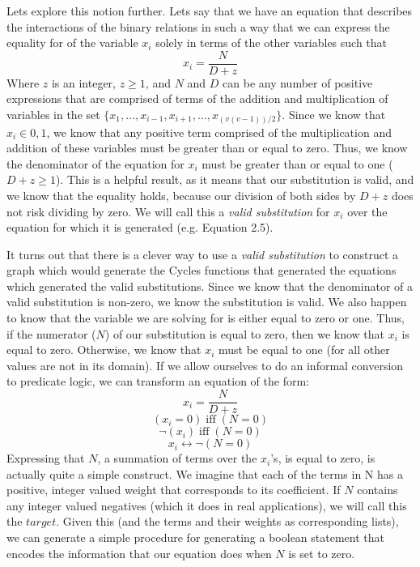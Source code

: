 Lets explore this notion further.  
Lets say that we have an equation that describes the interactions of the binary relations in such a way that we can express the equality for of the variable 
$x_i$ solely in terms of the other variables such that $$x_i = \frac{N}{D + z}$$ Where $z$ is an integer, $z \geq 1$, and $N$ and $D$ 
can be any number of positive expressions that are comprised of terms of the addition and multiplication of variables in the set 
$\{x_1, \dots,  x_{i-1},x_{i+1}, \dots, x_{(v(v-1))/2}\}$.  Since we know that $x_i \in {0,1}$, we know that any positive term comprised of the multiplication and addition of these variables must be greater than or equal to zero.  
Thus, we know the denominator of the equation for $x_i$ must be greater than or equal to one ($D + z \geq 1$). 
This is a helpful result, as it means that our substitution is valid, and we know that the equality holds, because our division of both sides by $D + z$ 
does not risk dividing by zero.  We will call this a \emph{valid substitution} for $x_i$ over the equation for which it is generated (e.g. Equation 2.5). 

It turns out that there is a clever way to use a \emph{valid substitution} to construct a graph which would generate the Cycles functions that generated the equations which generated the valid substitutions.
Since we know that the denominator of a valid substitution is non-zero, we know the substitution is valid.  
We also happen to know that the variable we are solving for is either equal to zero or one.  
Thus, if the numerator ($N$) of our substitution is equal to zero, then we know that $x_i$ is equal to zero.  
Otherwise, we know that $x_i$ must be equal to one (for all other values are not in its domain). 
If we allow ourselves to do an informal conversion to predicate logic, we can transform an equation of the form:
 $$x_i = \frac{N}{D + z}$$ 
 $$(x_i = 0) \; \text{iff} \; (N = 0)$$
 $$\neg(x_i) \; \text{iff} \; (N = 0)$$
 $$x_i  \leftrightarrow  \neg(N = 0)$$
Expressing that $N$, a summation of terms over the $x_i$'s, is equal to zero, is actually quite a simple construct. 
We imagine that each of the terms in N has a positive, integer valued weight that corresponds to its coefficient. 
If $N$ contains any integer valued negatives (which it does in real applications), we will call this the $target$.
Given this (and the terms and their weights as corresponding lists), we can generate a simple procedure for generating a boolean statement that encodes the information that our equation does when $N$ is set to zero.

